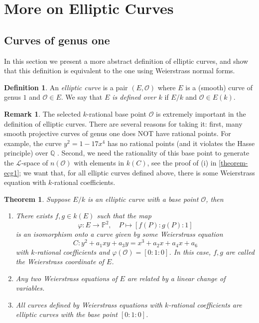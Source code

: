 \documentclass[12pt]{article}
\newtheorem{theorem}{Theorem}[subsection]
\theoremstyle{remark}
\theoremstyle{definition}
\newtheorem{remark}{Remark}[subsection]
\newtheorem{definition}{Definition}[subsection]
\newcommand{\ecO}[0]{\mathcal O}
\newcommand{\Pc}{\mathbb{P}}   %
\begin{document}
            
            
            
            
            
        \section{More on Elliptic Curves}
            \subsection{Curves of genus one}
            In this section we present a more abstract definition of elliptic curves, and show that this definition is equivalent to the one using Weierstrass normal forms.
            \begin{definition}
                An \textit{elliptic curve} is a pair $(E, \mathcal O)$ where $E$ is a (smooth) curve of genus $1$ and $\mathcal O\in E$. We say that \textit{$E$ is defined over $k$} if $E/k$ and $\mathcal O\in E(k)$.
            \end{definition}
            \begin{remark}
                The selected $k$-rational base point $\ecO$ is extremely important in the definition of elliptic curves. There are several reasons for taking it: first, many smooth projective curves of genus one does NOT have rational points. For example, the curve $y^2=1-17x^4$ has no rational points (and it violates the Hasse principle) over $\mathbb Q$ \cite{Poonen}. Second, we need the rationality of this base point to generate the $\mathcal L$-space of $n(\ecO)$ with elements in $k(C)$, see the proof of (i) in \autoref{theorem-ecg1}; we want that, for all elliptic curves defined above, there is some Weierstrass equation with $k$-rational coefficients. 
            \end{remark}
            \begin{theorem}\label{theorem-ecg1}
            Suppose $E/k$ is an elliptic curve with a base point $\mathcal O$, then
            \begin{enumerate}[\normalfont(i)]
                \item There exists $f, g\in k(E)$ such that the map
                \[\varphi:E\to\Pc^2,\quad P\mapsto [f(P):g(P):1]\]
                is an isomorphism onto a curve given by some Weierstrass equation
                \[C:y^2+a_1xy+a_3y=x^3+a_2x+a_4x+a_6\]
                with $k$-rational coefficients and $\varphi(\mathcal O)=[0:1:0]$. In this case, $f, g$ are called the \textit{Weierstrass coordinate of $E$}.
                \item Any two Weierstrass equations of $E$ are related by a linear change of variables.
                \item All curves defined by Weierstrass equations with $k$-rational coefficients are elliptic curves with the base point $[0:1:0]$.
            \end{enumerate}
            \end{theorem}
\end{document}

